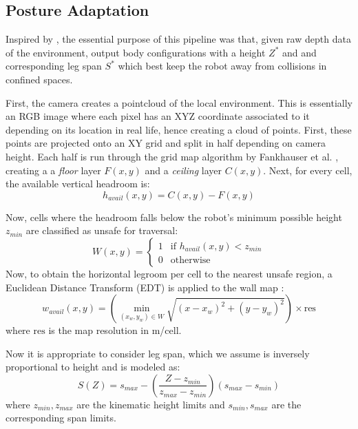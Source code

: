 \subsection{Posture Adaptation}

Inspired by \cite{buchananWalkingPostureAdaptation2019}, the essential purpose of this pipeline was that, given raw depth data of the environment, output body configurations with a height $Z^*$ and  and corresponding leg span $S^*$ which best keep the robot away from collisions in confined spaces.

First, the camera creates a pointcloud of the local environment. This is essentially an RGB image where each pixel has an XYZ coordinate associated to it depending on its location in real life, hence creating a cloud of points. First, these points are projected onto an XY grid and split in half depending on camera height. Each half is run through the grid map algorithm by Fankhauser et al. \cite{fankhauserRobotcentricElevationMapping2014}, creating a a \textit{floor}
layer $F(x,y)$ and a
\textit{ceiling} layer $C(x,y)$.
Next, for every cell, the available vertical headroom is:
\begin{equation}
    h_{avail}(x, y) = C(x, y) - F(x, y)
\end{equation}

Now, cells where the headroom falls below the robot's minimum possible
height $z_{min}$ are classified as unsafe for traversal:
\begin{equation}
    W(x, y) = \begin{cases} 1 & \text{if } h_{avail}(x, y) < z_{min} \\ 0 & \text{otherwise} \end{cases}
\end{equation}
Now, to obtain the horizontal legroom per cell to the nearest unsafe region, a Euclidean Distance Transform (EDT) is applied to the wall map :
\begin{equation}
    w_{avail}(x, y) = \left( \min_{(x_w, y_w) \in W} \sqrt{(x-x_w)^2 + (y-y_w)^2} \right) \times \text{res}
\end{equation}
where $\text{res}$ is the map resolution in m/cell.

Now it is appropriate to consider leg span, which we assume is inversely proportional to height and is modeled as:
\begin{equation}
    S(Z) = s_{max} - \left(\frac{Z - z_{min}}{z_{max} - z_{min}}\right)(s_{max} - s_{min})
\end{equation}
where $z_{min}, z_{max}$ are the kinematic height limits and
$s_{min}, s_{max}$ are the corresponding span limits.

